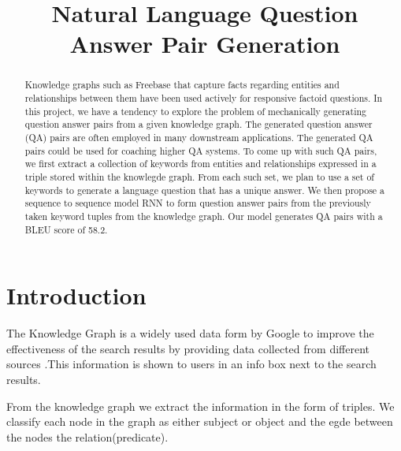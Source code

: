 \documentclass[conference]{IEEEtran}
\begin{document}
\title{Natural Language Question Answer Pair Generation\\
}

\author{
\and
{}
}

\maketitle

\begin{abstract}
Knowledge graphs such as Freebase that capture facts regarding entities and relationships between them have been used actively for responsive factoid questions. In this project, we have a tendency to explore the problem of mechanically generating question answer pairs from a given knowledge graph. The generated question answer (QA) pairs are often employed in many downstream applications. The generated QA pairs could be used for coaching higher QA systems. To come up with such QA pairs, we first extract a collection of keywords from entities and relationships expressed in a  triple stored within the knowlegde graph. From each such set, we plan to use a set of keywords to generate a language question that has a unique answer. We then propose a sequence to sequence model RNN to form question answer pairs from the previously taken keyword tuples from the knowledge graph. Our model generates QA pairs with a BLEU score of 58.2.

\end{abstract}


\section{Introduction}
The Knowledge Graph is a widely used data form by Google to improve the effectiveness of the search results  by providing data collected from different sources .This information is shown to users in an info box next to the search results. 

From the knowledge graph we extract the information in the form of triples. We classify each
node in the graph as either subject or object and the egde between the nodes the
relation(predicate).
\end{document}
